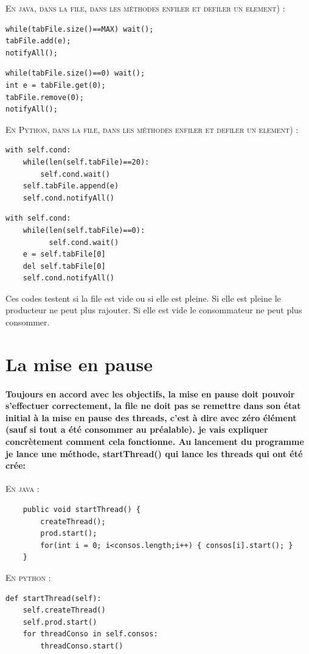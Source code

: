 \documentclass[a4paper]{report}
\begin{document}
\textsc{En java, dans la file, dans les méthodes enfiler et defiler un element) :}
\begin{verbatim}
while(tabFile.size()==MAX) wait();
tabFile.add(e);
notifyAll();
\end{verbatim}

\begin{verbatim}
while(tabFile.size()==0) wait();
int e = tabFile.get(0);
tabFile.remove(0);
notifyAll();
\end{verbatim}


\textsc{En Python, dans la file, dans les méthodes enfiler et defiler un element) :}

\begin{verbatim}
with self.cond:
    while(len(self.tabFile)==20):
        self.cond.wait()
    self.tabFile.append(e)
    self.cond.notifyAll()    
\end{verbatim}

\begin{verbatim}
with self.cond:
    while(len(self.tabFile)==0):
          self.cond.wait()
    e = self.tabFile[0]
    del self.tabFile[0]
    self.cond.notifyAll()
\end{verbatim}

Ces codes testent si la file est vide ou si elle est pleine. Si elle est pleine le producteur ne peut plus rajouter. Si elle est vide le consommateur ne peut plus consommer.

\section{La mise en pause}

\paragraph{Toujours en accord avec les objectifs, la mise en pause doit pouvoir s'effectuer correctement, la file ne doit pas se remettre dans son état initial à la mise en pause des threads, c'est à dire avec zéro élément (sauf si tout a été consommer au préalable). je vais expliquer concrètement comment cela fonctionne.
Au lancement du programme je lance une méthode, startThread() qui lance les threads qui ont été crée:}

\textsc{En java :}
\begin{verbatim}
	public void startThread() {
		createThread();
		prod.start();
		for(int i = 0; i<consos.length;i++) { consos[i].start(); }
	}
\end{verbatim}
\textsc{En python :}
\begin{verbatim}
def startThread(self):
    self.createThread()
    self.prod.start()
    for threadConso in self.consos:
        threadConso.start()
\end{verbatim}
\end{document}
